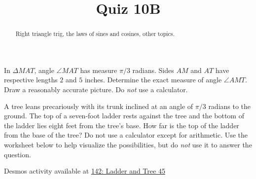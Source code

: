 \documentclass{ximera}
\title{Quiz 10B}
\begin{document}
\begin{abstract}
Right triangle trig, the laws of sines and cosines, other topics.
\end{abstract}
\maketitle


\begin{question} \label{Q898dfbfdgdsg}
In $\Delta MAT$, angle $\angle MAT$ has measure $\pi/3$ radians. Sides $AM$ and $AT$ have respective lengths $2$ and $5$ inches. Determine the exact measure of angle $\angle AMT$. Draw a reasonably accurate picture. Do \emph{not} use a calculator.
\end{question}

\begin{question} \label{QLMVVEVEeddf}
A tree leans precariously with its trunk inclined at an angle of $\pi/3$ radians to the ground. The top of a seven-foot ladder rests against the tree and the bottom of the ladder lies eight feet from the tree's base. How far is the top of the ladder from the base of the tree? Do not use a calculator except for arithmetic. Use the worksheet below to help visualize the possibilities, but do \emph{not} use it to answer the question.

\begin{onlineOnly}
    \begin{center}
\end{center}
\end{onlineOnly}

Desmos activity available at \href{https://www.desmos.com/calculator/sjmjseyqyp}{142: Ladder and Tree 45}


\end{question}
\end{document}
